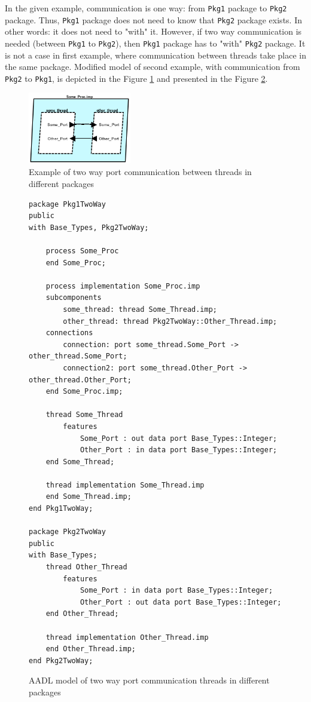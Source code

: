 In the given example, communication is one way: from \lstinline{Pkg1} package to \lstinline{Pkg2} package. Thus, \lstinline{Pkg1} package does not need to know that \lstinline{Pkg2} package exists. In other words: it does not need to "with" it. However, if two way communication is needed (between \lstinline{Pkg1} to \lstinline{Pkg2}), then \lstinline{Pkg1} package has to "with" \lstinline{Pkg2} package. It is not a case in first example, where communication between threads take place in the same package. Modified model of second example, with communication from \lstinline{Pkg2} to \lstinline{Pkg1}, is depicted in the Figure \ref{figure:port_communication_thread_two_way} and presented in the Figure \ref{listing:port_communication_thread_two_way}. 

\begin{figure}[ht]%
    \begin{center}
    	\includegraphics[width=0.4\textwidth]{figures/port-communication-thread-two-way.png}    	
    \end{center}
    \caption{Example of two way port communication between threads in different packages}
    \label{figure:port_communication_thread_two_way}
\end{figure}

\begin{figure}[ht]
\singlespacing
\begin{lstlisting}[language=aadl, frame=single, gobble=0]
package Pkg1TwoWay
public
with Base_Types, Pkg2TwoWay;

	process Some_Proc
	end Some_Proc;
	
	process implementation Some_Proc.imp
	subcomponents
		some_thread: thread Some_Thread.imp;
		other_thread: thread Pkg2TwoWay::Other_Thread.imp;
	connections
		connection: port some_thread.Some_Port -> other_thread.Some_Port;
		connection2: port some_thread.Other_Port -> other_thread.Other_Port;
	end Some_Proc.imp;

	thread Some_Thread
		features
			Some_Port : out data port Base_Types::Integer;
			Other_Port : in data port Base_Types::Integer;
	end Some_Thread;

	thread implementation Some_Thread.imp
	end Some_Thread.imp;	
end Pkg1TwoWay;

package Pkg2TwoWay
public
with Base_Types;
	thread Other_Thread
		features
			Some_Port : in data port Base_Types::Integer;
			Other_Port : out data port Base_Types::Integer;
	end Other_Thread;

	thread implementation Other_Thread.imp
	end Other_Thread.imp;
end Pkg2TwoWay;
\end{lstlisting} 
\doublespacing
\caption{AADL model of two way port communication threads in different packages}
\label{listing:port_communication_thread_two_way}
\end{figure}

